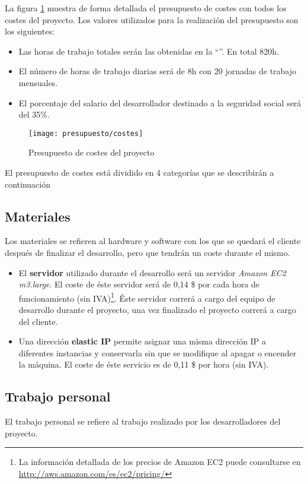La figura \ref{fig:presupuesto_costes} muestra de forma detallada el presupuesto de costes con todos los costes del proyecto.  Los valores utilizados para la realización del presupuesto son los siguientes:
\begin{itemize}
	\item Las horas de trabajo totales serán las obtenidas en la ``''. En total 820h.
	\item El número de horas de trabajo diarias será de 8h con 20 jornadas de trabajo mensuales.
	\item El porcentaje del salario del desarrollador destinado a la seguridad social será del 35\%.
\end{itemize}


	\begin{figure}[h]
		\centering
		\texttt{[image: presupuesto/costes]}
		\caption{Presupuesto de costes del proyecto}
		\label{fig:presupuesto_costes}
	\end{figure}

El presupuesto de costes está dividido en 4 categorías que se describirán a continuación

\subsection{Materiales}
	Los materiales se refieren al hardware y software con los que se quedará el cliente después de finalizar el desarrollo, pero que tendrán un coste durante el mismo.
	\begin{itemize}
		\item El \textbf{servidor} utilizado durante el desarrollo será un servidor \textit{Amazon EC2 m3.large}. El coste de éste servidor será de 0,14 \$ por cada hora de funcionamiento (sin IVA)\footnote{La información detallada de los precios de Amazon EC2 puede consultarse en \url{http://aws.amazon.com/es/ec2/pricing/}}.  Éste servidor correrá a cargo del equipo de desarrollo durante el proyecto, una vez finalizado el proyecto correrá a cargo del cliente.
		\item Una dirección \textbf{elastic IP} permite asignar una misma dirección IP a diferentes instancias y conservarla sin que se modifique al apagar o encender la máquina.  El coste de éste servicio es de 0,11 \$ por hora (sin IVA).
	\end{itemize}

\subsection{Trabajo personal}
	El trabajo personal se refiere al trabajo realizado por los desarrolladores del proyecto.
	
